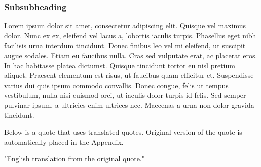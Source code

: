 	\subsubsection{Subsubheading}
	\label{subsubsec:subsubheading}
	Lorem ipsum dolor sit amet, consectetur adipiscing elit. Quisque vel maximus dolor. Nunc ex ex, eleifend vel lacus a, lobortis iaculis turpis. Phasellus eget nibh facilisis urna interdum tincidunt. Donec finibus leo vel mi eleifend, ut suscipit augue sodales. Etiam eu faucibus nulla. Cras sed vulputate erat, ac placerat eros. In hac habitasse platea dictumst. Quisque tincidunt tortor eu nisl pretium aliquet. Praesent elementum est risus, ut faucibus quam efficitur et. Suspendisse varius dui quis ipsum commodo convallis. Donec congue, felis ut tempus vestibulum, nulla nisi euismod orci, ut iaculis dolor turpis id felis. Sed semper pulvinar ipsum, a ultricies enim ultrices nec. Maecenas a urna non dolor gravida tincidunt.
	
	Below is a quote that uses translated quotes. Original version of the quote is automatically placed in the Appendix.
	
	\begin{displayquote}
		"English translation from the original quote."
	\end{displayquote}
	